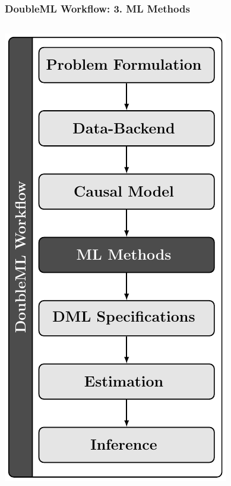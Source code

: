 \begin{frame}[fragile]
\frametitle{DoubleML Workflow: 3. ML Methods}
\begin{columns}
\begin{column}{0.3\textwidth}
\includegraphics[width = \textwidth]{workflow/doubleml_workflow_ml.pdf}

\end{column}
\end{columns}
\end{frame}
